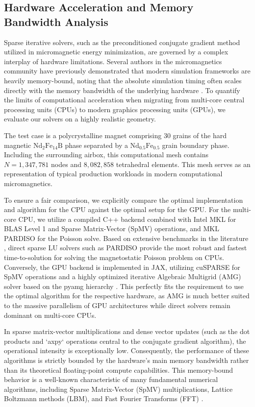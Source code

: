 \documentclass[10pt, a4paper, twocolumn]{article}
\begin{document}
\subsection{Hardware Acceleration and Memory Bandwidth Analysis}

Sparse iterative solvers, such as the preconditioned conjugate gradient method utilized in micromagnetic energy minimization, are governed by a complex interplay of hardware limitations. Several authors in the micromagnetics community have previously demonstrated that modern simulation frameworks are heavily memory-bound, noting that the absolute simulation timing often scales directly with the memory bandwidth of the underlying hardware \cite{Vansteenkiste2014, Lepadatu2020, Bruckner2023}. To quantify the limits of computational acceleration when migrating from multi-core central processing units (CPUs) to modern graphics processing units (GPUs), we evaluate our solvers on a highly realistic geometry. 

The test case is a polycrystalline magnet comprising 30 grains of the hard magnetic $\mathrm{Nd_2Fe_{14}B}$ phase separated by a $\mathrm{Nd_{0.5}Fe_{0.5}}$ grain boundary phase. Including the surrounding airbox, this computational mesh contains $N = 1,347,781$ nodes and $8,082,858$ tetrahedral elements. This mesh serves as an representation of typical production workloads in modern computational micromagnetics.

To ensure a fair comparison, we explicitly compare the optimal implementation and algorithm for the CPU against the optimal setup for the GPU. For the multi-core CPU, we utilize a compiled C++ backend combined with Intel MKL \cite{IntelMKL} for BLAS Level 1 and Sparse Matrix-Vector (SpMV) operations, and MKL PARDISO \cite{IntelMKL, Schenk2004} for the Poisson solve. Based on extensive benchmarks in the literature \cite{Schenk2004}, direct sparse LU solvers such as PARDISO provide the most robust and fastest time-to-solution for solving the magnetostatic Poisson problem on CPUs. Conversely, the GPU backend is implemented in JAX, utilizing cuSPARSE \cite{cuSPARSE} for SpMV operations and a highly optimized iterative Algebraic Multigrid (AMG) solver based on the pyamg hierarchy \cite{Bell2023}. This perfectly fits the requirement to use the optimal algorithm for the respective hardware, as AMG is much better suited to the massive parallelism of GPU architectures while direct solvers remain dominant on multi-core CPUs.

In sparse matrix-vector multiplications and dense vector updates (such as the dot products and `axpy` operations central to the conjugate gradient algorithm), the operational intensity is exceptionally low. Consequently, the performance of these algorithms is strictly bounded by the hardware's main memory bandwidth rather than its theoretical floating-point compute capabilities. This memory-bound behavior is a well-known characteristic of many fundamental numerical algorithms, including Sparse Matrix-Vector (SpMV) multiplications, Lattice Boltzmann methods (LBM), and Fast Fourier Transforms (FFT) \cite{Williams2009}.
\end{document}

